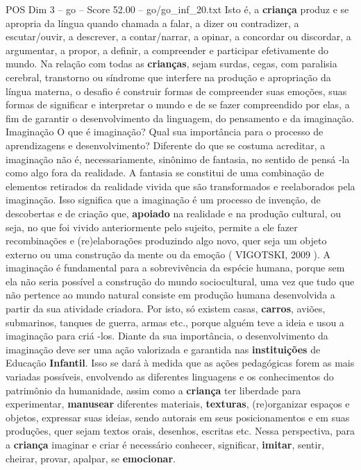 \begin{textsample}{POS Dim 3 – go – Score 52.00 – go/go\_inf\_20.txt}
Isto é, a \textbf{criança} produz e se apropria da língua quando chamada a falar, a dizer ou contradizer, a escutar/ouvir, a descrever, a contar/narrar, a opinar, a concordar ou discordar, a argumentar, a propor, a definir, a compreender e participar efetivamente do mundo.
Na relação com todas as \textbf{crianças}, sejam surdas, cegas, com paralisia cerebral, transtorno ou síndrome que interfere na produção e apropriação da língua materna, o desafio é construir formas de compreender suas emoções, suas formas de significar e interpretar o mundo e de se fazer compreendido por elas, a fim de garantir o desenvolvimento da linguagem, do pensamento e da imaginação.
Imaginação O que é imaginação?
Qual sua importância para o processo de aprendizagens e desenvolvimento?
Diferente do que se costuma acreditar, a imaginação não é, necessariamente, sinônimo de fantasia, no sentido de pensá -la como algo fora da realidade.
A fantasia se constitui de uma combinação de elementos retirados da realidade vivida que são transformados e reelaborados pela imaginação.
Isso significa que a imaginação é um processo de invenção, de descobertas e de criação que, \textbf{apoiado} na realidade e na produção cultural, ou seja, no que foi vivido anteriormente pelo sujeito, permite a ele fazer recombinações e (re)elaborações produzindo algo novo, quer seja um objeto externo ou uma construção da mente ou da emoção ( VIGOTSKI, 2009 ).
A imaginação é fundamental para a sobrevivência da espécie humana, porque sem ela não seria possível a construção do mundo sociocultural, uma vez que tudo que não pertence ao mundo natural consiste em produção humana desenvolvida a partir da sua atividade criadora.
Por isto, só existem casas, \textbf{carros}, aviões, submarinos, tanques de guerra, armas etc., porque alguém teve a ideia e usou a imaginação para criá -los.
Diante da sua importância, o desenvolvimento da imaginação deve ser uma ação valorizada e garantida nas \textbf{instituições} de Educação \textbf{Infantil}.
Isso se dará à medida que as ações pedagógicas forem as mais variadas possíveis, envolvendo as diferentes linguagens e os conhecimentos do patrimônio da humanidade, assim como a \textbf{criança} ter liberdade para experimentar, \textbf{manusear} diferentes materiais, \textbf{texturas}, (re)organizar espaços e objetos, expressar suas ideias, sendo autorais em seus posicionamentos e em suas produções, quer sejam textos orais, desenhos, escritas etc.
Nessa perspectiva, para a \textbf{criança} imaginar e criar é necessário conhecer, significar, \textbf{imitar}, sentir, cheirar, provar, apalpar, se \textbf{emocionar}.

\end{textsample}
